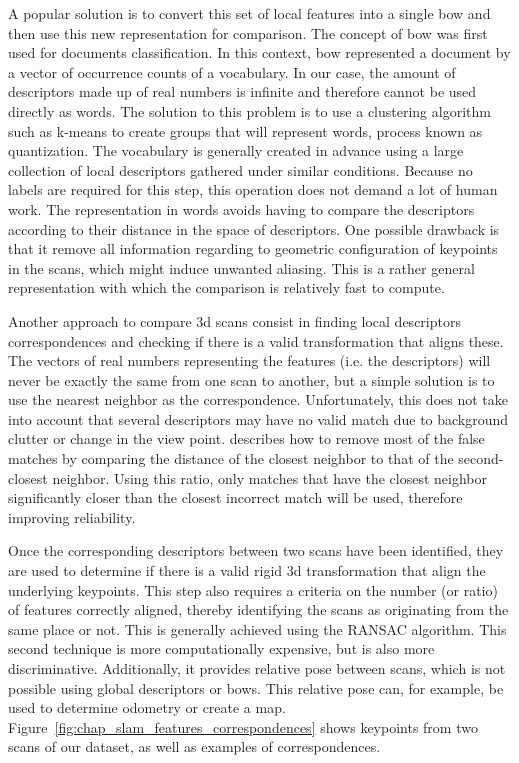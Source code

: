 A popular solution is to convert this set of local features into a single \gls*{bow} and then use this new representation for comparison. The concept of \gls*{bow} was first used for documents classification. In this context, \gls*{bow} represented a document by a vector of occurrence counts of a vocabulary. In our case, the amount of descriptors made up of real numbers is infinite and therefore cannot be used directly as words. The solution to this problem is to use a clustering algorithm such as k-means to create groups that will represent words, process known as quantization. The vocabulary is generally created in advance using a large collection of local descriptors gathered under similar conditions. Because no labels are required for this step, this operation does not demand a lot of human work. The representation in words avoids having to compare the descriptors according to their distance in the space of descriptors. One possible drawback is that it remove all information regarding to geometric configuration of keypoints in the scans, which might induce unwanted aliasing. This is a rather general representation with which the comparison is relatively fast to compute.

Another approach to compare \gls*{3d} scans consist in finding local descriptors correspondences and checking if there is a valid transformation that aligns these. The vectors of real numbers representing the features (i.e. the descriptors) will never be exactly the same from one scan to another, but a simple solution is to use the nearest neighbor as the correspondence. Unfortunately, this does not take into account that several descriptors may have no valid match due to background clutter or change in the view point. \cite[Section 7.1]{Lowe2004} describes how to remove most of the false matches by comparing the distance of the closest neighbor to that of the second-closest neighbor. Using this ratio, only matches that have the closest neighbor significantly closer than the closest incorrect match will be used, therefore improving reliability.

Once the corresponding descriptors between two scans have been identified, they are used to determine if there is a valid rigid \gls*{3d} transformation that align the underlying keypoints. This step also requires a criteria on the number (or ratio) of features correctly aligned, thereby identifying the scans as originating from the same place or not. This is generally achieved using the RANSAC algorithm. This second technique is more computationally expensive, but is also more discriminative. Additionally, it provides relative pose between scans, which is not possible using global descriptors or \gls*{bow}s. This relative pose can, for example, be used to determine odometry or create a map. Figure~\ref{fig:chap_slam_features_correspondences} shows keypoints from two scans of our dataset, as well as examples of correspondences.

